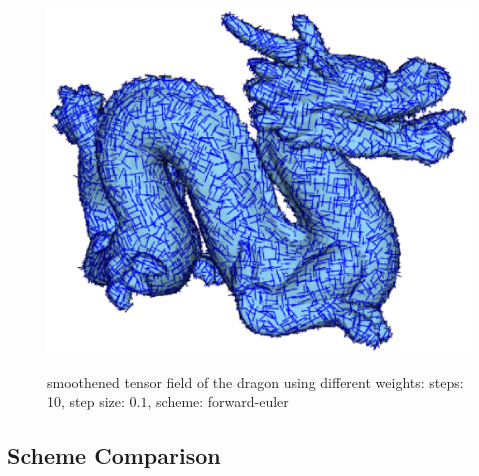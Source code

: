 \documentclass[a4paper,10pt,notitlepage]{scrreprt}
\begin{document}
\begin{figure}
{    \includegraphics[scale=0.35]{img-2-2/dragon-t-10-01-mean-forwardeuler.eps}}
 \caption{smoothened tensor field of the dragon using different weights: steps:
10, step size: $0.1$, scheme: forward-euler}
 \label{fig:smooth-weights-curvature-tensor}
\end{figure}

\subsection{Scheme Comparison}
\end{document}
